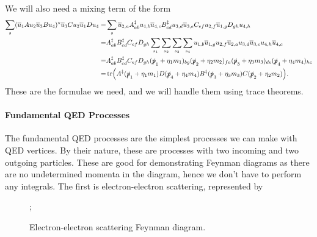 We will also need a mixing term of the form
\begin{align*}
	\sum\limits_{s}(\overline{u}_{1}Au_{2}\overline{u}_{3}Bu_{4})^{\star}\overline{u}_{3}Cu_{2}\overline{u}_{1}Du_{4} =& \sum\limits_{s}\overline{u}_{2, a}A_{ab}^{\ddagger}u_{1, b}\overline{u}_{4, c}B_{cd}^{\ddagger}u_{3, d}\overline{u}_{3, e}C_{ef}u_{2, f}\overline{u}_{1, g}D_{gh}u_{4, h} \\
	=& A_{ab}^{\ddagger}B_{cd}^{\ddagger}C_{ef}D_{gh}\sum\limits_{s_{1}}\sum\limits_{s_{2}}\sum\limits_{s_{3}}\sum\limits_{s_{4}}u_{1, b}\overline{u}_{1, g}u_{2, f}\overline{u}_{2, a}u_{3, d}\overline{u}_{3, e}u_{4, h}\overline{u}_{4, c} \\
	=& A_{ab}^{\ddagger}B_{cd}^{\ddagger}C_{ef}D_{gh}(\slashed{p}_{1} + \eta_{1}m_{1})_{bg}(\slashed{p}_{2} + \eta_{2}m_{2})_{fa}(\slashed{p}_{3} + \eta_{3}m_{3})_{de}(\slashed{p}_{4} + \eta_{4}m_{4})_{hc} \\
	=& \tr(A^{\ddagger}(\slashed{p}_{1} + \eta_{1}m_{1})D(\slashed{p}_{4} + \eta_{4}m_{4})B^{\ddagger}(\slashed{p}_{3} + \eta_{3}m_{3})C(\slashed{p}_{2} + \eta_{2}m_{2})).
\end{align*}
These are the formulae we need, and we will handle them using trace theorems.

\paragraph{Fundamental QED Processes}
The fundamental QED processes are the simplest processes we can make with QED vertices. By their nature, these are processes with two incoming and two outgoing particles. These are good for demonstrating Feynman diagrams as there are no undetermined momenta in the diagram, hence we don't have to perform any integrals. The first is electron-electron scattering, represented by
\begin{figure}[!ht]
	\centering
	;
	\caption{Electron-electron scattering Feynman diagram.}
	\label{fig:eescat}
\end{figure}

